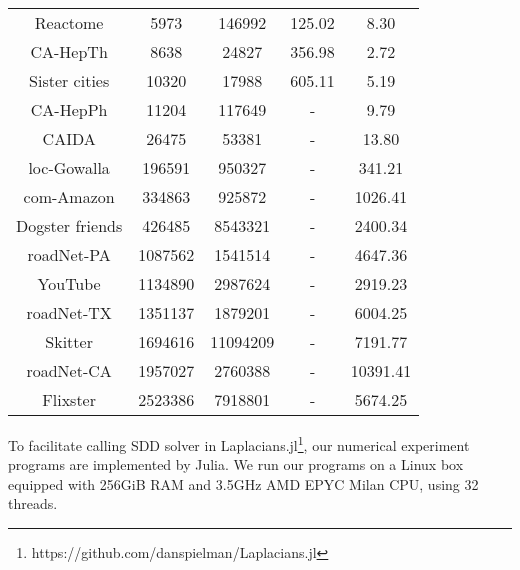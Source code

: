 \documentclass[sigconf]{acmart}
\begin{document}
\begin{table}
\begin{tabular}{ccccc}
    Reactome               & 5973                 & 146992               & 125.02                             & 8.30            \\
    CA-HepTh               & 8638                 & 24827                & 356.98                             & 2.72            \\
    Sister cities          & 10320                & 17988                & 605.11                             & 5.19            \\
    CA-HepPh               & 11204                & 117649               & -                                  & 9.79            \\
    CAIDA                  & 26475                & 53381                & -                                  & 13.80           \\
    loc-Gowalla            & 196591               & 950327               & -                                  & 341.21          \\
    com-Amazon             & 334863               & 925872               & -                                  & 1026.41         \\
    Dogster friends        & 426485               & 8543321              & -                                  & 2400.34         \\
    roadNet-PA             & 1087562              & 1541514              & -                                  & 4647.36         \\
    YouTube                & 1134890              & 2987624              & -                                  & 2919.23         \\
    roadNet-TX             & 1351137              & 1879201              & -                                  & 6004.25         \\
    Skitter                & 1694616              & 11094209             & -                                  & 7191.77         \\
    roadNet-CA             & 1957027              & 2760388              & -                                  & 10391.41        \\
    Flixster               & 2523386              & 7918801              & -                                  & 5674.25         \\
    \bottomrule
  \end{tabular}
\end{table}

To facilitate calling SDD solver in Laplacians.jl\footnote{https://github.com/danspielman/Laplacians.jl}, our numerical experiment programs are implemented by Julia.
We run our programs on a Linux box equipped with 256GiB RAM and 3.5GHz AMD EPYC Milan CPU, using 32 threads.
\end{document}
